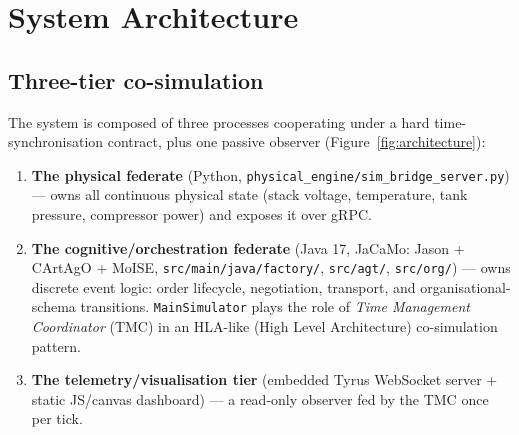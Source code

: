 \documentclass[twocolumn,10pt,a4paper]{article}
\newcommand{\code}[1]{\texttt{\small #1}}
\newcommand{\file}[1]{\texttt{#1}}
\begin{document}
\section{System Architecture}
\label{ch:architecture}

\subsection{Three-tier co-simulation}
The system is composed of three processes cooperating under a hard time-synchronisation contract, plus one passive observer (Figure~\ref{fig:architecture}):

\begin{enumerate}
\item \textbf{The physical federate} (Python, \file{physical\_engine/sim\_bridge\_server.py}) --- owns all continuous physical state (stack voltage, temperature, tank pressure, compressor power) and exposes it over gRPC.
\item \textbf{The cognitive/orchestration federate} (Java 17, JaCaMo: Jason + CArtAgO + MoISE, \file{src/main/java/factory/}, \file{src/agt/}, \file{src/org/}) --- owns discrete event logic: order lifecycle, negotiation, transport, and organisational-schema transitions. \code{MainSimulator} plays the role of \emph{Time Management Coordinator} (TMC) in an HLA-like (High Level Architecture) co-simulation pattern.
\item \textbf{The telemetry/visualisation tier} (embedded Tyrus WebSocket server + static JS/canvas dashboard) --- a read-only observer fed by the TMC once per tick.
\end{enumerate}
\end{document}
